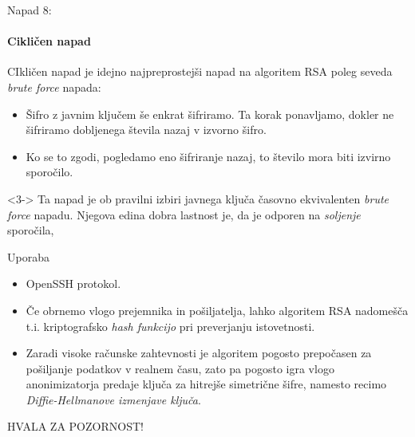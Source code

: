 \documentclass[a4paper, 12pt]{beamer} %
\begin{document}
\begin{frame}{Napad 8:}
\framesubtitle{Cikličen napad}
CIkličen napad je idejno najpreprostejši napad na algoritem RSA poleg seveda \emph{brute force} napada:
\begin{itemize}[label=]
\item<1-> Šifro z javnim ključem še enkrat šifriramo. Ta korak ponavljamo, dokler ne šifriramo dobljenega števila nazaj v izvorno šifro.
\item<2-> Ko se to zgodi, pogledamo eno šifriranje nazaj, to število mora biti izvirno sporočilo.
\end{itemize}
\begin{block}<3->{}
Ta napad je ob pravilni izbiri javnega ključa časovno ekvivalenten \emph{brute force} napadu.
\newline
Njegova edina dobra lastnost je, da je odporen na \emph{soljenje} sporočila, 
\end{block}
\end{frame}

\begin{frame}{Uporaba}
\begin{itemize}[label=]
\item<1-> OpenSSH protokol.
\item<2-> Če obrnemo vlogo prejemnika in pošiljatelja, lahko algoritem RSA nadomešča t.i. kriptografsko \emph{hash funkcijo} pri preverjanju istovetnosti.
\item<3-> Zaradi visoke računske zahtevnosti je algoritem pogosto prepočasen za pošiljanje podatkov v realnem času, zato pa pogosto igra vlogo anonimizatorja predaje ključa za hitrejše simetrične šifre, namesto recimo \emph{Diffie-Hellmanove izmenjave ključa}.
\end{itemize}
\end{frame}

\begin{frame}
\begin{block}{}
\LARGE
\centering
HVALA ZA POZORNOST!
\end{block}
\end{frame}
\end{document}
